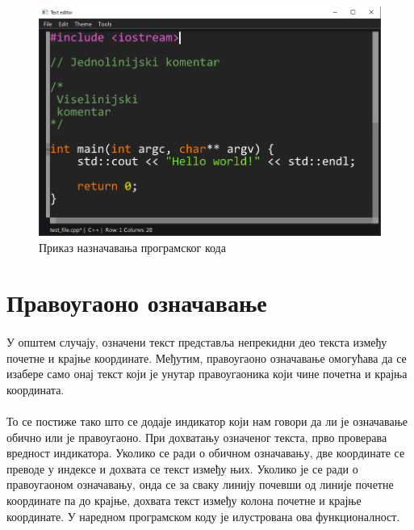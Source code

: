 \documentclass[12pt,oneside]{memoir}
\begin{document}
\begin{figure}[!ht]
	\centering
	\includegraphics[width=1.0\textwidth]{images/text_highlighting.png}
	\caption{Приказ назначавања програмског кода}
	\label{fig:text_highlighting}
\end{figure}


\section{Правоугаоно означавање}

\paragraph{}
У општем случају, означени текст представља непрекидни део текста
између почетне и крајње координате. Међутим, правоугаоно означавање
омогућава да се изабере само онај текст који је унутар правоугаоника
који чине почетна и крајња координата. 

\paragraph{}
То се постиже тако што се додаје индикатор који нам говори да ли
је означавање обично или је правоугаоно. При дохватању означеног
текста, прво проверава вредност индикатора. Уколико се ради о обичном
означавању, две координате се преводе у индексе и дохвата се текст између
њих. Уколико је се ради о правоугаоном означавању, онда се за сваку линију
почевши од линије почетне координате па до крајње, дохвата текст између колона
почетне и крајње координате. У наредном програмском коду је илустрована ова
функционалност.
\end{document}
